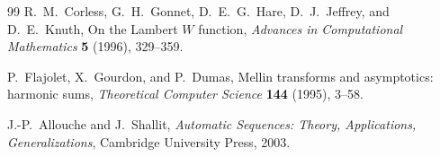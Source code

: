 \documentclass[11pt,oneside]{article}
\theoremstyle{definition}
\theoremstyle{remark}
\begin{document}
\begin{thebibliography}{99}
R.~M.~Corless, G.~H.~Gonnet, D.~E.~G.~Hare, D.~J.~Jeffrey, and D.~E.~Knuth,
\newblock On the Lambert $W$ function,
\newblock \emph{Advances in Computational Mathematics} \textbf{5} (1996), 329--359.

P.~Flajolet, X.~Gourdon, and P.~Dumas,
\newblock Mellin transforms and asymptotics: harmonic sums,
\newblock \emph{Theoretical Computer Science} \textbf{144} (1995), 3--58.

J.-P.~Allouche and J.~Shallit,
\newblock \emph{Automatic Sequences: Theory, Applications, Generalizations},
\newblock Cambridge University Press, 2003.

\end{thebibliography}
\end{document}
